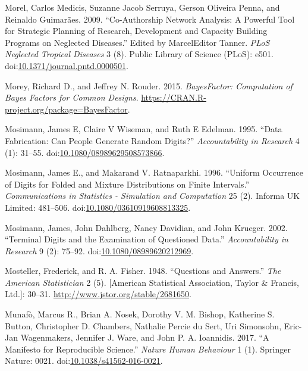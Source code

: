 \documentclass[a5paper]{book}
\begin{document}
\hypertarget{ref-doi:10.1371ux2fjournal.pntd.0000501}{}
Morel, Carlos Medicis, Suzanne Jacob Serruya, Gerson Oliveira Penna, and
Reinaldo Guimarães. 2009. ``Co-Authorship Network Analysis: A Powerful
Tool for Strategic Planning of Research, Development and Capacity
Building Programs on Neglected Diseases.'' Edited by MarcelEditor
Tanner. \emph{PLoS Neglected Tropical Diseases} 3 (8). Public Library of
Science (PLoS): e501.
doi:\href{https://doi.org/10.1371/journal.pntd.0000501}{10.1371/journal.pntd.0000501}.

\hypertarget{ref-bf}{}
Morey, Richard D., and Jeffrey N. Rouder. 2015. \emph{BayesFactor:
Computation of Bayes Factors for Common Designs}.
\url{https://CRAN.R-project.org/package=BayesFactor}.

\hypertarget{ref-doi:10.1080ux2f08989629508573866}{}
Mosimann, James E, Claire V Wiseman, and Ruth E Edelman. 1995. ``Data
Fabrication: Can People Generate Random Digits?'' \emph{Accountability
in Research} 4 (1): 31--55.
doi:\href{https://doi.org/10.1080/08989629508573866}{10.1080/08989629508573866}.

\hypertarget{ref-doi:10.1080ux2f03610919608813325}{}
Mosimann, James E., and Makarand V. Ratnaparkhi. 1996. ``Uniform
Occurrence of Digits for Folded and Mixture Distributions on Finite
Intervals.'' \emph{Communications in Statistics - Simulation and
Computation} 25 (2). Informa UK Limited: 481--506.
doi:\href{https://doi.org/10.1080/03610919608813325}{10.1080/03610919608813325}.

\hypertarget{ref-doi:10.1080ux2f08989620212969}{}
Mosimann, James, John Dahlberg, Nancy Davidian, and John Krueger. 2002.
``Terminal Digits and the Examination of Questioned Data.''
\emph{Accountability in Research} 9 (2): 75--92.
doi:\href{https://doi.org/10.1080/08989620212969}{10.1080/08989620212969}.

\hypertarget{ref-doi:10.2307ux2f2681650}{}
Mosteller, Frederick, and R. A. Fisher. 1948. ``Questions and Answers.''
\emph{The American Statistician} 2 (5). {[}American Statistical
Association, Taylor \& Francis, Ltd.{]}: 30--31.
\url{http://www.jstor.org/stable/2681650}.

\hypertarget{ref-doi:10.1038ux2fs41562-016-0021}{}
Munafò, Marcus R., Brian A. Nosek, Dorothy V. M. Bishop, Katherine S.
Button, Christopher D. Chambers, Nathalie Percie du Sert, Uri Simonsohn,
Eric-Jan Wagenmakers, Jennifer J. Ware, and John P. A. Ioannidis. 2017.
``A Manifesto for Reproducible Science.'' \emph{Nature Human Behaviour}
1 (1). Springer Nature: 0021.
doi:\href{https://doi.org/10.1038/s41562-016-0021}{10.1038/s41562-016-0021}.
\end{document}
